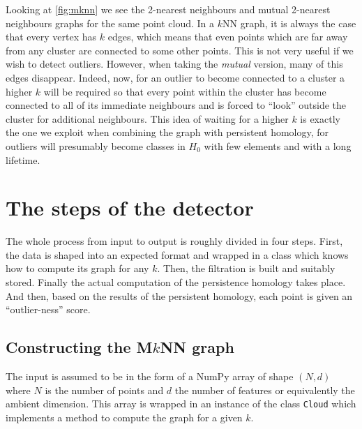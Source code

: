 \documentclass[../main.tex]{subfiles}
\begin{document}
Looking at \cref{fig:mknn} we see the 2-nearest neighbours and mutual 2-nearest neighbours
graphs for the same point cloud. In a \( k \)NN	 graph, it is always the case that every
vertex has \( k \) edges, which means that even points which are far away from any cluster
are connected to some other points. This is not very useful if we wish to detect outliers.
However, when taking the \emph{mutual} version, many of this edges disappear. Indeed, now,
for an outlier to become connected to a cluster a higher \( k \) will be required so that
every point within the cluster has become connected to all of its immediate neighbours and
is forced to ``look'' outside the cluster for additional neighbours. This idea of waiting
for a higher \( k \) is exactly the one we exploit when combining the \MKNN graph with
persistent homology, for outliers will presumably become classes in	\( H_0 \) with few
elements and with a long lifetime. 

\section{The steps of the detector}
The whole process from input to output is roughly divided in four steps. First, the data is
shaped into an expected format and wrapped in a class which knows how to compute its
\MKNN	graph for any \( k \). Then, the filtration is built and suitably stored. Finally
the actual computation of the persistence homology takes place. And then, based on the
results of the persistent homology, each point is given an ``outlier-ness'' score. 

\subsection{Constructing the M\texorpdfstring{\( k \)}{k}NN graph}
The input is assumed to be in the form of a \textsf{NumPy} array of shape \( (N,d) \)
where \( N \) is the number of points and \( d \) the number of features or equivalently
the ambient dimension. This array is wrapped in an instance of the class \texttt{Cloud}
which implements a method to compute the \MKNN graph for a given \( k \). 
\end{document}
